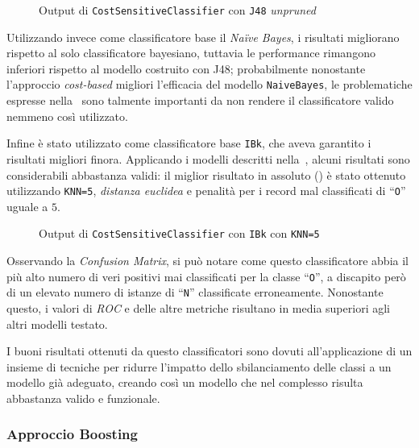 \begin{figure}[H]
  \centering
  \caption{Output di \texttt{CostSensitiveClassifier} con \texttt{J48} \emph{unpruned}}%
  \label{fig:cost:j48}
\end{figure}

Utilizzando invece come classificatore base il \emph{Naïve Bayes}, i risultati migliorano rispetto al solo classificatore bayesiano, tuttavia le performance rimangono inferiori rispetto al modello costruito con J48;
probabilmente nonostante l'approccio \emph{cost-based} migliori l'efficacia del modello \texttt{NaiveBayes}, le problematiche espresse nella~ sono talmente importanti da non rendere il classificatore valido nemmeno così utilizzato.

Infine è stato utilizzato come classificatore base \texttt{IBk}, che aveva garantito i risultati migliori finora.
Applicando i modelli descritti nella~, alcuni risultati sono considerabili abbastanza validi:
il miglior risultato in assoluto () è stato ottenuto utilizzando \texttt{KNN=5}, \emph{distanza euclidea} e penalità per i record mal classificati di ``\texttt{O}'' uguale a \(5\).

\begin{figure}[H]
  \centering
  \caption{Output di \texttt{CostSensitiveClassifier} con \texttt{IBk} con \texttt{KNN=5}}%
  \label{fig:cost:ibk5}
\end{figure}

Osservando la \emph{Confusion Matrix}, si può notare come questo classificatore abbia il più alto numero di veri positivi mai classificati per la classe ``\texttt{O}'',
a discapito però di un elevato numero di istanze di ``\texttt{N}'' classificate erroneamente.
Nonostante questo, i valori di \emph{ROC} e delle altre metriche risultano in media superiori agli altri modelli testato.

I buoni risultati ottenuti da questo classificatori sono dovuti all'applicazione di un insieme di tecniche per ridurre l'impatto dello sbilanciamento delle classi a un modello già adeguato,
creando così un modello che nel complesso risulta abbastanza valido e funzionale.

\subsubsection{Approccio Boosting}

